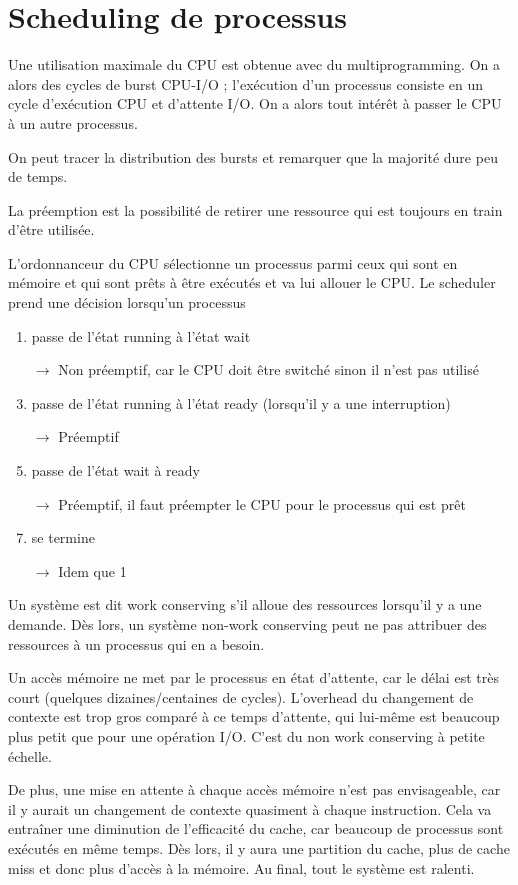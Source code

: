 \chapter{Scheduling de processus}

Une utilisation maximale du CPU est obtenue avec du multiprogramming. On a alors des cycles de burst CPU-I/O ; l'exécution d'un processus consiste en un cycle d'exécution CPU et d'attente I/O. On a alors tout intérêt à passer le CPU à un autre processus.

On peut tracer la distribution des bursts et remarquer que la majorité dure peu de temps.


La préemption est la possibilité de retirer une ressource qui est toujours en train d'être utilisée.

L'ordonnanceur du CPU sélectionne un processus parmi ceux qui sont en mémoire et qui sont prêts à être exécutés et va lui allouer le CPU. Le scheduler prend une décision lorsqu'un processus

\begin{enumerate}
	\item passe de l'état running à l'état wait
	\item[$\rightarrow$] Non préemptif, car le CPU doit être switché sinon il n'est pas utilisé
	\item passe de l'état running à l'état ready (lorsqu'il y a une interruption)
	\item[$\rightarrow$] Préemptif
	\item passe de l'état wait à ready
	\item[$\rightarrow$] Préemptif, il faut préempter le CPU pour le processus qui est prêt
	\item se termine
	\item[$\rightarrow$] Idem que 1
\end{enumerate}


Un système est dit work conserving s'il alloue des ressources lorsqu'il y a une demande. Dès lors, un système non-work conserving peut ne pas attribuer des ressources à un processus qui en a besoin.

Un accès mémoire ne met par le processus en état d'attente, car le délai est très court (quelques dizaines/centaines de cycles). L'overhead du changement de contexte est trop gros comparé à ce temps d'attente, qui lui-même est beaucoup plus petit que pour une opération I/O. C'est du non work conserving à petite échelle.

De plus, une mise en attente à chaque accès mémoire n'est pas envisageable, car il y aurait un changement de contexte quasiment à chaque instruction. Cela va entraîner une diminution de l'efficacité du cache, car beaucoup de processus sont exécutés en même temps. Dès lors, il y aura une partition du cache, plus de cache miss et donc plus d'accès à la mémoire. Au final, tout le système est ralenti.

